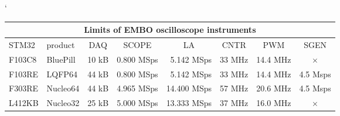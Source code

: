 \documentclass{article}
\begin{document}
\begin{table}[!htbp]
\catcode`
\bgroup
\def\arraystretch{1.5}%
\begin{tabular}  { |l|l||c|c|c|c|c|c| }
 \hline
 \multicolumn{8}{|c|}{ Limits of EMBO oscilloscope instruments } \\
 \hline
 STM32 & product & DAQ & SCOPE & LA & CNTR & PWM & SGEN \\
 \hhline{|=|=||=|=|=|=|=|=|}
F103C8 & BluePill & 10 kB & 0.800 MSps & \,\,\,5.142 MSps & 33 MHz & 14.4 MHz & $\times$  \\
F103RE & LQFP64 & 44 kB & 0.800 MSps & \,\,\,5.142 MSps & 33 MHz & 14.4 MHz & 4.5 Msps  \\
F303RE & Nucleo64 & 44 kB & 4.965 MSps & 14.400 MSps & 57 MHz & 20.6 MHz & 4.5 Msps  \\
L412KB & Nucleo32 & 25 kB & 5.000 MSps & 13.333 MSps & 37 MHz & 16.0 MHz & $\times$ \\
 \hline
\end{tabular}
\egroup
\end{table}
\end{document}
